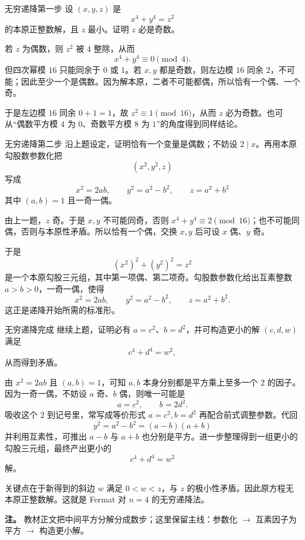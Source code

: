 \begin{problem}{无穷递降第一步}
设 $(x,y,z)$ 是
\[
x^4+y^4=z^2
\]
的本原正整数解，且 $z$ 最小。证明 $z$ 必是奇数。
\end{problem}
\begin{solution}
若 $z$ 为偶数，则 $z^2$ 被 $4$ 整除，从而
\[
x^4+y^4\equiv0\pmod4.
\]
但四次幂模 $16$ 只能同余于 $0$ 或 $1$。若 $x,y$ 都是奇数，则左边模 $16$ 同余 $2$，不可能；因此至少一个是偶数。因为解本原，二者不可能都偶，所以恰有一个偶、一个奇。

于是左边模 $16$ 同余 $0+1=1$，故 $z^2\equiv1\pmod{16}$，从而 $z$ 必为奇数。也可从“偶数平方模 $4$ 为 $0$、奇数平方模 $8$ 为 $1$”的角度得到同样结论。
\end{solution}

\begin{problem}{无穷递降第二步}
沿上题设定，证明恰有一个变量是偶数；不妨设 $2\mid x$。再用本原勾股数参数化把
\[
(x^2,y^2,z)
\]
写成
\[
x^2=2ab,\qquad y^2=a^2-b^2,\qquad z=a^2+b^2
\]
其中 $(a,b)=1$ 且一奇一偶。
\end{problem}
\begin{solution}
由上一题，$z$ 奇。于是 $x,y$ 不可能同奇，否则 $x^4+y^4\equiv2\pmod{16}$；也不可能同偶，否则与本原性矛盾。所以恰有一个偶，交换 $x,y$ 后可设 $x$ 偶、$y$ 奇。

于是
\[
(x^2)^2+(y^2)^2=z^2
\]
是一个本原勾股三元组，其中第一项偶、第二项奇。勾股数参数化给出互素整数 $a>b>0$，一奇一偶，使得
\[
x^2=2ab,\qquad y^2=a^2-b^2,\qquad z=a^2+b^2.
\]
这正是递降开始所需的标准形。
\end{solution}

\begin{problem}{无穷递降完成}
继续上题，证明必有 $a=c^2$、$b=d^2$，并可构造更小的解 $(c,d,w)$ 满足
\[
c^4+d^4=w^2,
\]
从而得到矛盾。
\end{problem}
\begin{solution}
由 $x^2=2ab$ 且 $(a,b)=1$，可知 $a,b$ 本身分别都是平方乘上至多一个 $2$ 的因子。因为一奇一偶，不妨设 $a$ 奇、$b$ 偶，则唯一可能是
\[
a=c^2,\qquad b=2d^2.
\]
吸收这个 $2$ 到记号里，常写成等价形式 $a=c^2,b=d^2$ 再配合前式调整参数。代回
\[
y^2=a^2-b^2=(a-b)(a+b)
\]
并利用互素性，可推出 $a-b$ 与 $a+b$ 也分别是平方。进一步整理得到一组更小的勾股三元组，最终产出更小的
\[
c^4+d^4=w^2
\]
解。

关键点在于新得到的斜边 $w$ 满足 $0<w<z$，与 $z$ 的极小性矛盾。因此原方程无本原正整数解。这就是 Fermat 对 $n=4$ 的无穷递降法。

\textbf{注。} 教材正文把中间平方分解分成数步；这里保留主线：参数化 $\to$ 互素因子为平方 $\to$ 构造更小解。
\end{solution}

